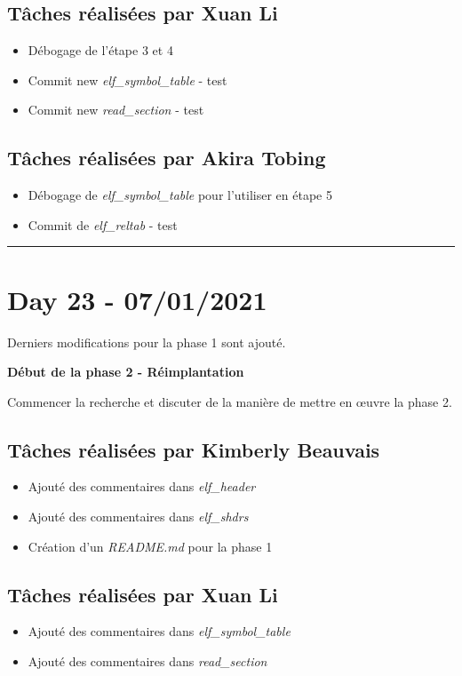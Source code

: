 \documentclass[11pt,letterpaper]{article}
\begin{document}
\subsection*{Tâches réalisées par Xuan Li}
\begin{itemize}
    \item Débogage de l'étape 3 et 4
    \item Commit new \textit{elf\_symbol\_table} - test
    \item Commit new \textit{read\_section} - test
\end{itemize}

\subsection*{Tâches réalisées par Akira Tobing}
\begin{itemize}
    \item Débogage de \textit{elf\_symbol\_table} pour l'utiliser en étape 5
    \item Commit de \textit{elf\_reltab} - test
\end{itemize}

\noindent\rule{13cm}{0.4pt}

\section*{Day 23 - 07/01/2021}
Derniers modifications pour la phase 1 sont ajouté. 

\noindent \textbf{Début de la phase 2 - Réimplantation}

\noindent Commencer la recherche et discuter de la manière de mettre en œuvre 
la phase 2.


\subsection*{Tâches réalisées par Kimberly Beauvais}
\begin{itemize}
    \item Ajouté des commentaires dans \textit{elf\_header}
    \item Ajouté des commentaires dans \textit{elf\_shdrs}
    \item Création d'un \textit{README.md} pour la phase 1
\end{itemize}

\subsection*{Tâches réalisées par Xuan Li}
\begin{itemize}
    \item Ajouté des commentaires dans \textit{elf\_symbol\_table}
    \item Ajouté des commentaires dans \textit{read\_section}
\end{itemize}
\end{document}
